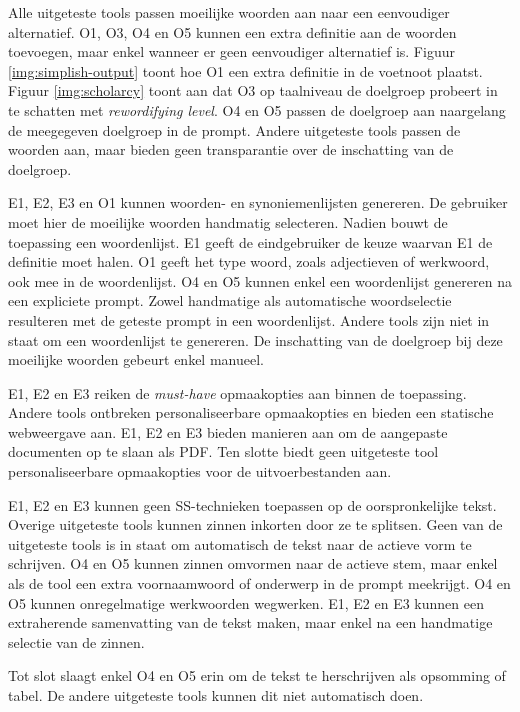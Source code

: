 Alle uitgeteste tools passen moeilijke woorden aan naar een eenvoudiger alternatief. O1, O3, O4 en O5 kunnen een extra definitie aan de woorden toevoegen, maar enkel wanneer er geen eenvoudiger alternatief is. Figuur \ref{img:simplish-output} toont hoe O1 een extra definitie in de voetnoot plaatst. Figuur \ref{img:scholarcy} toont aan dat O3 op taalniveau de doelgroep probeert in te schatten met \textit{rewordifying level}. O4 en O5 passen de doelgroep aan naargelang de meegegeven doelgroep in de prompt. Andere uitgeteste tools passen de woorden aan, maar bieden geen transparantie over de inschatting van de doelgroep.

\medspace

E1, E2, E3 en O1 kunnen woorden- en synoniemenlijsten genereren. De gebruiker moet hier de moeilijke woorden handmatig selecteren. Nadien bouwt de toepassing een woordenlijst. E1 geeft de eindgebruiker de keuze waarvan E1 de definitie moet halen. O1 geeft het type woord, zoals adjectieven of werkwoord, ook mee in de woordenlijst. O4 en O5 kunnen enkel een woordenlijst genereren na een expliciete prompt. Zowel handmatige als automatische woordselectie resulteren met de geteste prompt in een woordenlijst. Andere tools zijn niet in staat om een woordenlijst te genereren. De inschatting van de doelgroep bij deze moeilijke woorden gebeurt enkel manueel.

\medspace

E1, E2 en E3 reiken de \textit{must-have} opmaakopties aan binnen de toepassing. Andere tools ontbreken personaliseerbare opmaakopties en bieden een statische webweergave aan. E1, E2 en E3 bieden manieren aan om de aangepaste documenten op te slaan als PDF. Ten slotte biedt geen uitgeteste tool personaliseerbare opmaakopties voor de uitvoerbestanden aan. 

\medspace

E1, E2 en E3 kunnen geen SS-technieken toepassen op de oorspronkelijke tekst. Overige uitgeteste tools kunnen zinnen inkorten door ze te splitsen. Geen van de uitgeteste tools is in staat om automatisch de tekst naar de actieve vorm te schrijven. O4 en O5 kunnen zinnen omvormen naar de actieve stem, maar enkel als de tool een extra voornaamwoord of onderwerp in de prompt meekrijgt. O4 en O5 kunnen onregelmatige werkwoorden wegwerken. E1, E2 en E3 kunnen een extraherende samenvatting van de tekst maken, maar enkel na een handmatige selectie van de zinnen. 

\medspace

Tot slot slaagt enkel O4 en O5 erin om de tekst te herschrijven als opsomming of tabel. De andere uitgeteste tools kunnen dit niet automatisch doen.

